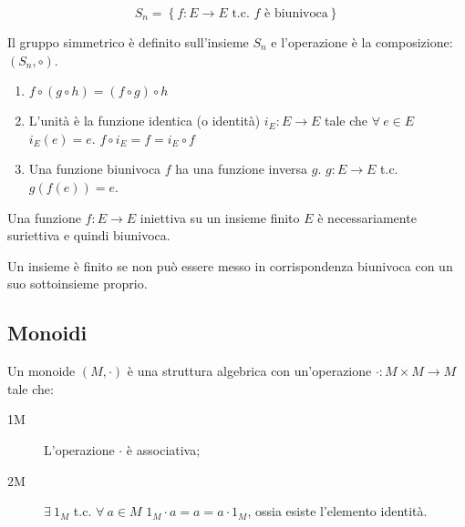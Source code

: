\[
S_n = \left\{ f : E \to E \text{ t.c. $f$ \`e biunivoca} \right\}
\]

Il gruppo simmetrico \`e definito sull'insieme $S_n$ e l'operazione \`e la composizione: $\left( S_n, \circ \right)$.
\begin{enumerate}
    \item $f \circ \left( g \circ h \right) = \left( f \circ g \right) \circ h$ 
    \item L'unit\`a \`e la funzione identica (o identit\`a) $i_E : E \to E$ tale che $\forall \ e \in E $ $i_E(e) = e$. $f \circ i_E = f = i_E \circ f$ 
    \item Una funzione biunivoca $f$ ha una funzione inversa $g$. $g : E \to E $ t.c. $ g(f(e)) = e$.
\end{enumerate}

Una funzione $f : E \to E $ iniettiva su un insieme finito $E$ \`e necessariamente suriettiva e quindi biunivoca.

Un insieme \`e finito se non pu\`o essere messo in corrispondenza biunivoca con un suo sottoinsieme proprio.






\subsection{Monoidi}

Un monoide $(M, \cdot)$ \`e una struttura algebrica con un'operazione $\cdot : M \times M \to M$ tale che:
\begin{description}
    \item[1M] L'operazione $\cdot$ \`e associativa;
    \item[2M] $\exists \ 1_M $ t.c. $ \forall \ a \in M$ $ 1_M \cdot a = a = a \cdot 1_M$, ossia esiste l'elemento identit\`a. 
\end{description}

